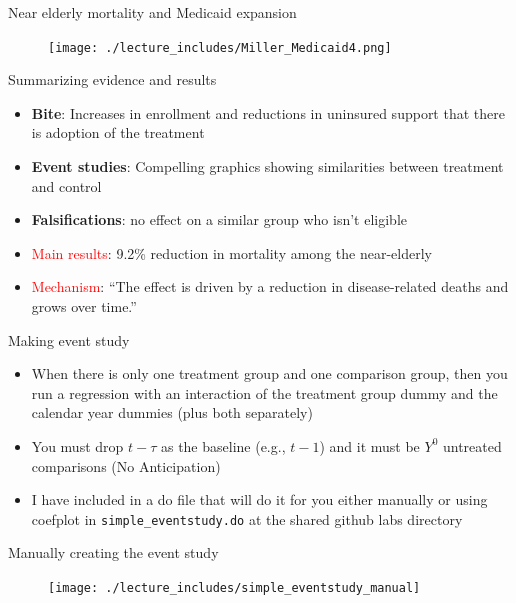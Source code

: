 \documentclass{beamer}
\begin{document}
\begin{frame}{Near elderly mortality and Medicaid expansion}

	\begin{figure}
	\texttt{[image: ./lecture\_includes/Miller\_Medicaid4.png]}
	\end{figure}

\end{frame}

\begin{frame}{Summarizing evidence and results}

\begin{itemize}
\item \textbf{Bite}: Increases in enrollment and reductions in uninsured support that there is adoption of the treatment
\item \textbf{Event studies}: Compelling graphics showing similarities between treatment and control
\item \textbf{Falsifications}: no effect on a similar group who isn't eligible
\item \textcolor{red}{Main results}: 9.2\% reduction in mortality among the near-elderly
\item \textcolor{red}{Mechanism}: ``The effect is driven by a reduction in disease-related deaths and grows over time.''
\end{itemize}

\end{frame}

\begin{frame}{Making event study}

\begin{itemize}
\item When there is only one treatment group and one comparison group, then you run a regression with an interaction of the treatment group dummy and the calendar year dummies (plus both separately)
\item You must drop $t-\tau$ as the baseline (e.g., $t-1$) and it must be $Y^0$ untreated comparisons (No Anticipation)
\item I have included in a do file that will do it for you either manually or using coefplot in \texttt{simple\_eventstudy.do} at the shared github labs directory
\end{itemize}

\end{frame}


\begin{frame}{Manually creating the event study}

	\begin{figure}
	\texttt{[image: ./lecture\_includes/simple\_eventstudy\_manual]}
	\end{figure}

\end{frame}
\end{document}
